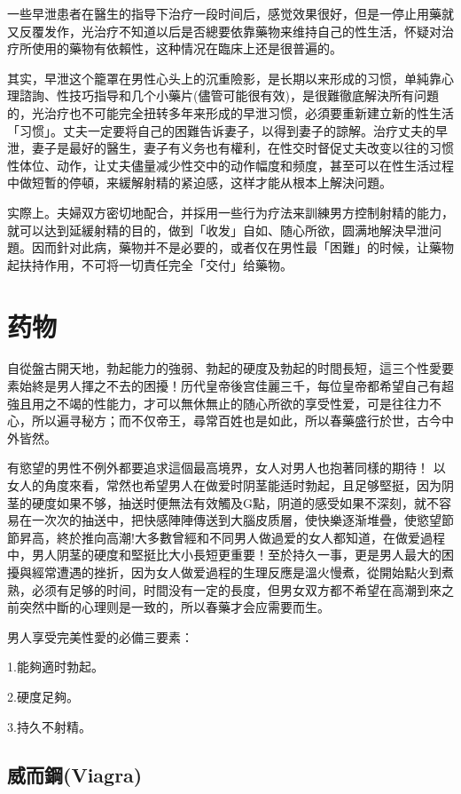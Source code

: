 \documentclass[12pt,UTF8]{ctexbook}
\begin{document}
一些早泄患者在醫生的指导下治疗一段时间后，感觉效果很好，但是一停止用藥就又反覆发作，光治疗不知道以后是否總要依靠藥物来维持自己的性生活，怀疑对治疗所使用的藥物有依賴性，这种情况在臨床上还是很普遍的。

其实，早泄这个籠罩在男性心头上的沉重險影，是长期以来形成的习惯，单純靠心理諮詢、性技巧指导和几个小藥片(儘管可能很有效)，是很難徹底解決所有问題的，光治疗也不可能完全扭转多年来形成的早泄习惯，必須要重新建立新的性生活「习惯」。丈夫一定要将自己的困難告诉妻子，以得到妻子的諒解。治疗丈夫的早泄，妻子是最好的醫生，妻子有义务也有權利，在性交时督促丈夫改变以往的习惯性体位、动作，让丈夫儘量减少性交中的动作幅度和频度，甚至可以在性生活过程中做短暫的停頓，来緩解射精的紧迫感，这样才能从根本上解決问題。

实際上。夫婦双方密切地配合，并採用一些行为疗法来訓練男方控制射精的能力，就可以达到延緩射精的目的，做到「收发」自如、随心所欲，圆满地解決早泄问題。因而針对此病，藥物并不是必要的，或者仅在男性最「困難」的时候，让藥物起扶持作用，不可将一切責任完全「交付」给藥物。

\chapter{药物}

自從盤古開天地，勃起能力的強弱、勃起的硬度及勃起的时間長短，這三个性愛要素始終是男人揮之不去的困擾！历代皇帝後宫佳麗三千，每位皇帝都希望自己有超強且用之不竭的性能力，才可以無休無止的随心所欲的享受性爱，可是往往力不心，所以遍寻秘方；而不仅帝王，尋常百姓也是如此，所以春藥盛行於世，古今中外皆然。

有慾望的男性不例外都要追求這個最高境界，女人对男人也抱著同樣的期待！
以女人的角度來看，常然也希望男人在做爱时阴茎能适时勃起，且足够堅挺，因为阴茎的硬度如果不够，抽送时便無法有效觸及G點，阴道的感受如果不深刻，就不容易在一次次的抽送中，把快感陣陣傳送到大腦皮质層，使快樂逐渐堆疊，使慾望節節昇高，終於推向高潮!大多數曾經和不同男人做過爱的女人都知道，在做爱過程中，男人阴茎的硬度和堅挺比大小長短更重要！至於持久一事，更是男人最大的困擾與經常遭遇的挫折，因为女人做爱過程的生理反應是溫火慢煮，從開始點火到煮熟，必须有足够的时间，时間没有一定的長度，但男女双方都不希望在高潮到來之前突然中斷的心理则是一致的，所以春藥才会应需要而生。

男人享受完美性愛的必備三要素：

1.能夠適时勃起。

2.硬度足夠。

3.持久不射精。

\section{威而鋼(Viagra)}
\end{document}
